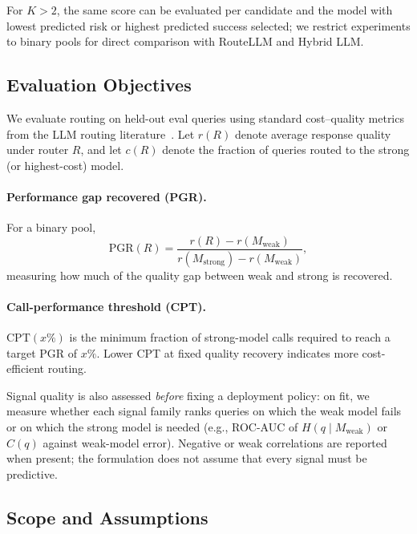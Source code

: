 For $K>2$, the same score can be evaluated per candidate and the model with lowest predicted risk or highest predicted success selected; we restrict experiments to binary pools for direct comparison with RouteLLM and Hybrid LLM.

\subsection{Evaluation Objectives}
\label{sec:eval-objectives}

We evaluate routing on held-out eval queries using standard cost--quality metrics from the LLM routing literature~\cite{ong2025routellm,ding2024hybrid}.
Let $r(R)$ denote average response quality under router $R$, and let $c(R)$ denote the fraction of queries routed to the strong (or highest-cost) model.

\paragraph{Performance gap recovered (PGR).}
For a binary pool,
\begin{equation}
\mathrm{PGR}(R)=
\frac{r(R)-r(M_{\mathrm{weak}})}{r(M_{\mathrm{strong}})-r(M_{\mathrm{weak}})},
\end{equation}
measuring how much of the quality gap between weak and strong is recovered.

\paragraph{Call-performance threshold (CPT).}
$\mathrm{CPT}(x\%)$ is the minimum fraction of strong-model calls required to reach a target PGR of $x\%$.
Lower CPT at fixed quality recovery indicates more cost-efficient routing.

Signal quality is also assessed \emph{before} fixing a deployment policy: on fit, we measure whether each signal family ranks queries on which the weak model fails or on which the strong model is needed (e.g., ROC-AUC of $H(q\mid M_{\mathrm{weak}})$ or $C(q)$ against weak-model error).
Negative or weak correlations are reported when present; the formulation does not assume that every signal must be predictive.

\subsection{Scope and Assumptions}
\label{sec:scope}

